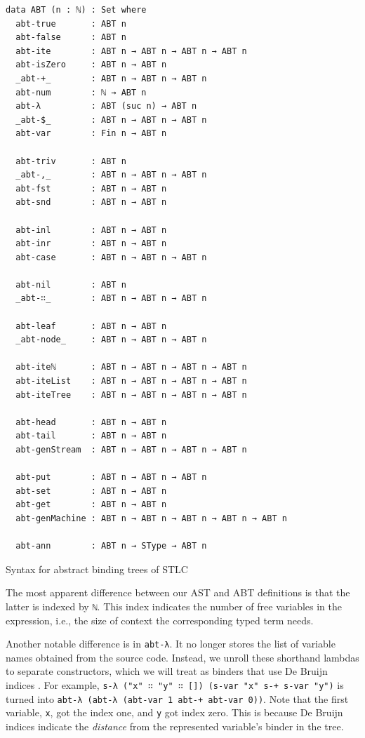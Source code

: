 \begin{listing}[H]
\begin{verbatim}
data ABT (n : ℕ) : Set where
  abt-true       : ABT n
  abt-false      : ABT n
  abt-ite        : ABT n → ABT n → ABT n → ABT n
  abt-isZero     : ABT n → ABT n
  _abt-+_        : ABT n → ABT n → ABT n
  abt-num        : ℕ → ABT n
  abt-λ          : ABT (suc n) → ABT n
  _abt-$_        : ABT n → ABT n → ABT n
  abt-var        : Fin n → ABT n

  abt-triv       : ABT n
  _abt-,_        : ABT n → ABT n → ABT n
  abt-fst        : ABT n → ABT n
  abt-snd        : ABT n → ABT n

  abt-inl        : ABT n → ABT n
  abt-inr        : ABT n → ABT n
  abt-case       : ABT n → ABT n → ABT n

  abt-nil        : ABT n
  _abt-∷_        : ABT n → ABT n → ABT n

  abt-leaf       : ABT n → ABT n
  _abt-node_     : ABT n → ABT n → ABT n

  abt-iteℕ       : ABT n → ABT n → ABT n → ABT n
  abt-iteList    : ABT n → ABT n → ABT n → ABT n
  abt-iteTree    : ABT n → ABT n → ABT n → ABT n

  abt-head       : ABT n → ABT n
  abt-tail       : ABT n → ABT n
  abt-genStream  : ABT n → ABT n → ABT n → ABT n

  abt-put        : ABT n → ABT n → ABT n
  abt-set        : ABT n → ABT n
  abt-get        : ABT n → ABT n
  abt-genMachine : ABT n → ABT n → ABT n → ABT n → ABT n

  abt-ann        : ABT n → SType → ABT n
\end{verbatim}
\caption{Syntax for abstract binding trees of STLC}
\label{code:abt-def}
\end{listing}

The most apparent difference between our AST and ABT definitions is that the latter is indexed by \verb$ℕ$. This index indicates the number of free variables in the expression, i.e., the size of context the corresponding typed term needs.

Another notable difference is in \verb$abt-λ$. It no longer stores the list of variable names obtained from the source code. Instead, we unroll these shorthand lambdas to separate constructors, which we will treat as binders that use De Bruijn indices \cite{de1972lambda}. For example, \verb$s-λ ("x" ∷ "y" ∷ []) (s-var "x" s-+ s-var "y")$ is turned into \verb$abt-λ (abt-λ (abt-var 1 abt-+ abt-var 0))$. Note that the first variable, \verb$x$, got the index one, and \verb$y$ got index zero. This is because De Bruijn indices indicate the \textit{distance} from the represented variable's binder in the tree.


